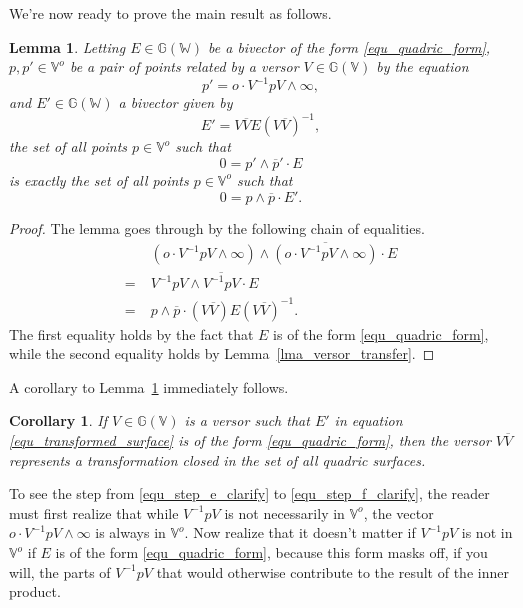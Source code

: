 \documentclass{birkjour}
\newtheorem{cor}[thm]{Corollary}
\newtheorem{lem}[thm]{Lemma}
\theoremstyle{definition}
\theoremstyle{remark}
\numberwithin{equation}{section}
\newcommand{\G}{\mathbb{G}}
\newcommand{\V}{\mathbb{V}}
\newcommand{\W}{\mathbb{W}}
\newcommand{\nvao}{o}
\newcommand{\nvai}{\infty}
\begin{document}
We're now ready to prove the main result as follows.
\begin{lem}\label{lma_quadric_transform}
Letting $E\in\G(\W)$ be a bivector of the form \eqref{equ_quadric_form},
$p,p'\in\V^o$ be a pair of points related by a versor $V\in\G(\V)$ by
the equation
\begin{equation}\label{equ_get_rid_ni}
p' = \nvao\cdot V^{-1}pV\wedge\nvai,
\end{equation}
and $E'\in\G(\W)$ a bivector given by
\begin{equation}\label{equ_transformed_surface}
E' = V\overline{V}E(V\overline{V})^{-1},
\end{equation}
the set of all points $p\in\V^\nvao$ such that
\begin{equation}\label{equ_wanted_set}
0 = p'\wedge\overline{p}'\cdot E
\end{equation}
is exactly the set of all points $p\in\V^\nvao$ such that
\begin{equation}\label{equ_derived_set}
0 = p\wedge\overline{p}\cdot E'.
\end{equation}
\end{lem}
\begin{proof}
The lemma goes through by the following chain of equalities.
\begin{align}
 & (\nvao\cdot V^{-1}pV\wedge\nvai)\wedge\overline{(\nvao\cdot V^{-1}pV\wedge\nvai)}\cdot E\label{equ_step_e_clarify} \\
=\;& V^{-1}pV\wedge\overline{V^{-1}pV}\cdot E\label{equ_step_f_clarify} \\
=\;& p\wedge\overline{p}\cdot(V\overline{V})E(V\overline{V})^{-1}.
\end{align}
The first equality holds by the fact that $E$ is of the form \eqref{equ_quadric_form},
while the second equality holds by Lemma~\ref{lma_versor_transfer}.
\end{proof}
A corollary to Lemma~\ref{lma_quadric_transform} immediately follows.
\begin{cor}\label{cor_quadric_transform}
If $V\in\G(\V)$ is a versor such that $E'$ in equation \eqref{equ_transformed_surface}
is of the form \eqref{equ_quadric_form}, then the versor $V\overline{V}$
represents a transformation closed in the set of all quadric surfaces.
\end{cor}

To see the step from \eqref{equ_step_e_clarify} to \eqref{equ_step_f_clarify}, the reader must first realize that
while $V^{-1}pV$ is not necessarily in $\V^o$, the vector
$\nvao\cdot V^{-1}pV\wedge\nvai$ is always in $\V^o$.  Now realize
that it doesn't matter if $V^{-1}pV$ is not in $\V^o$ if $E$
is of the form \eqref{equ_quadric_form}, because this form masks
off, if you will, the parts of $V^{-1}pV$ that would otherwise
contribute to the result of the inner product.
\end{document}
